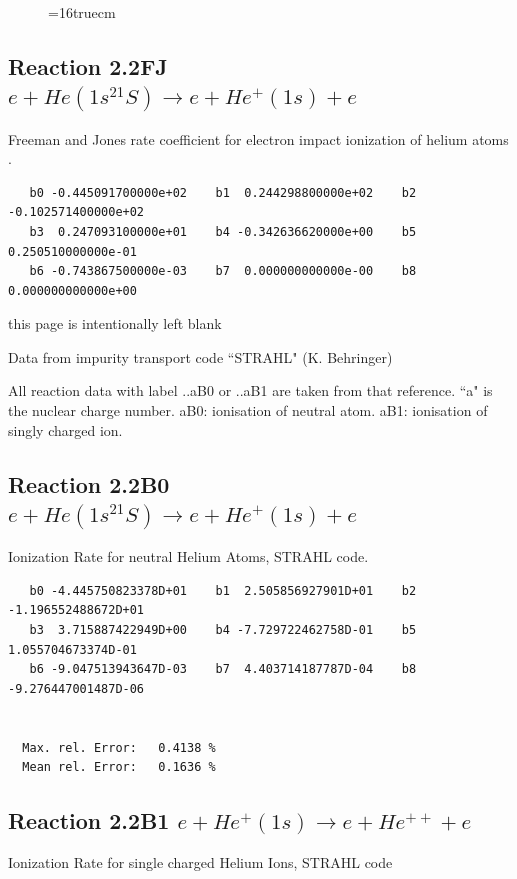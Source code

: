 \documentclass[12pt,dvipdfmx]{article}
\begin{document}
\begin{figure} \label{n2+}
\epsfxsize=16truecm
\end{figure}
\newpage




\subsection{
Reaction 2.2FJ  $e + He(1s^21S) \rightarrow e + He^+(1s) + e$ } Freeman
and Jones rate coefficient for electron impact ionization of helium atoms \cite{kn:Freeman} .

\begin{small}\begin{verbatim}
   b0 -0.445091700000e+02    b1  0.244298800000e+02    b2 -0.102571400000e+02
   b3  0.247093100000e+01    b4 -0.342636620000e+00    b5  0.250510000000e-01
   b6 -0.743867500000e-03    b7  0.000000000000e-00    b8  0.000000000000e+00
\end{verbatim}\end{small}
\newpage
this page is intentionally left blank
\newpage

Data from impurity transport code ``STRAHL" (K. Behringer) \cite{kn:Behringer}

All reaction data with label ..aB0 or ..aB1 are taken from that
reference. ``a" is the nuclear charge number. aB0: ionisation of neutral atom. aB1: ionisation of singly charged ion.




\subsection{
Reaction 2.2B0   $e + He(1s^21S) \rightarrow e + He^+(1s) + e $
}
Ionization Rate for neutral Helium Atoms, STRAHL code.
\begin{small}\begin{verbatim}
   b0 -4.445750823378D+01    b1  2.505856927901D+01    b2 -1.196552488672D+01
   b3  3.715887422949D+00    b4 -7.729722462758D-01    b5  1.055704673374D-01
   b6 -9.047513943647D-03    b7  4.403714187787D-04    b8 -9.276447001487D-06


  Max. rel. Error:   0.4138 %
  Mean rel. Error:   0.1636 %
\end{verbatim}\end{small}


\subsection{
Reaction 2.2B1   $e + He^+(1s) \rightarrow e + He^{++} + e$
}
Ionization Rate for single charged Helium Ions, STRAHL code
\end{document}
